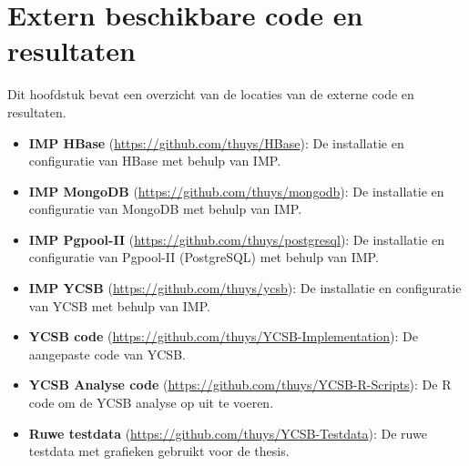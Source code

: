 \chapter{Extern beschikbare code en resultaten}\label{app:externlinks}
Dit hoofdstuk bevat een overzicht van de locaties van de externe code en resultaten. 
\begin{itemize}
	\item \textbf{IMP HBase} (\url{https://github.com/thuys/HBase}): De installatie en configuratie van HBase met behulp van IMP. 
	\item \textbf{IMP MongoDB} (\url{https://github.com/thuys/mongodb}): De installatie en configuratie van MongoDB met behulp van IMP. 
	\item \textbf{IMP Pgpool-II} (\url{https://github.com/thuys/postgresql}): De installatie en configuratie van Pgpool-II (PostgreSQL) met behulp van IMP. 
	\item \textbf{IMP YCSB} (\url{https://github.com/thuys/ycsb}): De installatie en configuratie van YCSB met behulp van IMP. 
	\item \textbf{YCSB code} (\url{https://github.com/thuys/YCSB-Implementation}): De aangepaste code van YCSB. 
	\item \textbf{YCSB Analyse code} (\url{https://github.com/thuys/YCSB-R-Scripts}): De R code om de YCSB analyse op uit te voeren. 
	\item \textbf{Ruwe testdata} (\url{https://github.com/thuys/YCSB-Testdata}): De ruwe testdata met grafieken gebruikt voor de thesis. 
\end{itemize}